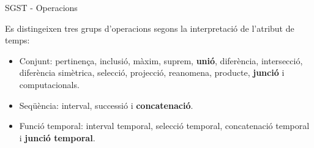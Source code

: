 \begin{frame}{SGST - Operacions}




  Es distingeixen tres grups d'operacions segons la interpretació de l'atribut de temps: 
  \begin{itemize}
  \item Conjunt: pertinença, inclusió, màxim, suprem, \textbf{unió},
    diferència, intersecció, diferència simètrica, selecció,
    projecció, reanomena, producte, \textbf{junció} i computacionals.
  \item Seqüència: interval, successió i \textbf{concatenació}.
  \item Funció temporal: interval temporal, selecció temporal,
    concatenació temporal i \textbf{junció temporal}.
  \end{itemize}


\end{frame}


